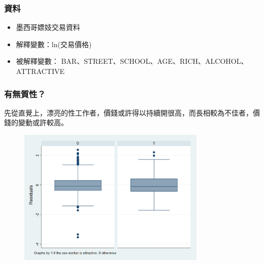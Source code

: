 \begin{frame}
    \frametitle{資料}
    
    \begin{itemize}
        \item 墨西哥嫖妓交易資料
        \item 解釋變數：ln(交易價格)
        \item 被解釋變數： BAR、STREET、SCHOOL、AGE、RICH、ALCOHOL、ATTRACTIVE
    \end{itemize}
\end{frame}

\begin{frame}
    \frametitle{有無質性？}

    先從直覺上，漂亮的性工作者，價錢或許得以持續開很高，而長相較為不佳者，價錢的變動或許較高。
    \begin{figure}
        \includegraphics[width=0.8\textwidth]{../Results/boxplot_attractive_res.png}
    \end{figure}
\end{frame}

